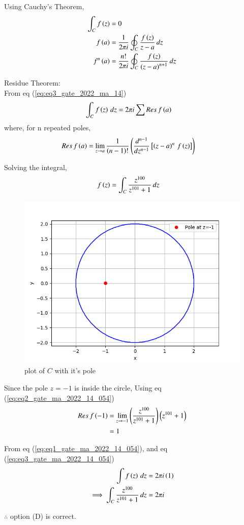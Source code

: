 \documentclass[journal,12pt,twocolumn]{IEEEtran}
\begin{document}
Using Cauchy's Theorem,
\begin{align}
    \int_C f\left(z\right) &= 0\\
    f\left(a\right) &= \frac{1}{2 \pi i}\oint_C\frac{f\left(z\right)}{z-a}\, dz\\
    f^{n}\left(a\right) &= \frac{n!}{2 \pi i}\oint_C\frac{f\left(z\right)}{\left(z-a\right)^{n+1}}\, dz
\end{align}

Residue Theorem:\\
From eq (\ref{eq:eq3_gate_2022_ma_14})
\begin{align}
    \int_C f\left(z\right)\, dz &= 2 \pi i \sum{Res \, f\ensuremath{\left(a\right)}} \label{eq:eq1_gate_ma_2022_14_054}
\end{align}
where, for n repeated poles,
\begin{align}
    Res \, f\left(a\right) &= \lim_{z \to a}\frac{1}{\left(n-1\right)!}\left(\frac{d^{n-1}}{dz^{n-1}}{}\left[\left(z-a\right)^n\, f\left(z\right)\right]\right) \label{eq:eq2_gate_ma_2022_14_054}
\end{align}

Solving the integral,
\begin{align}
f\left(z\right) &= \int_C \frac{z^{100}}{z^{101}+1}\, dz
\end{align}

\begin{figure}[ht]
    \centering
    \includegraphics[width=\columnwidth]{figs/Figure_1.png}
    \caption{plot of $C$ with it's pole}
    \label{fig:fig1_gate_ma_2022_14_054}
\end{figure}
Since the pole $z=-1$ is inside the circle, Using eq (\ref{eq:eq2_gate_ma_2022_14_054})
\begin{align}
    Res\, f\left(-1\right) &= \lim_{z\to -1}\left(\frac{z^{100}}{z^{101}+1}\right)\left(z^{101} + 1\right)\\
    &= 1 \label{eq:eq3_gate_ma_2022_14_054}
\end{align}

From eq (\ref{eq:eq1_gate_ma_2022_14_054}), and eq (\ref{eq:eq3_gate_ma_2022_14_054})
\begin{align}
    \int f\left(z\right)\, dz &= 2\pi i \left(1\right)\\
    \implies \int_C \frac{z^{100}}{z^{101}+1}\, dz &= 2 \pi i
\end{align}

$\therefore$ option (D) is correct.
\end{document}
